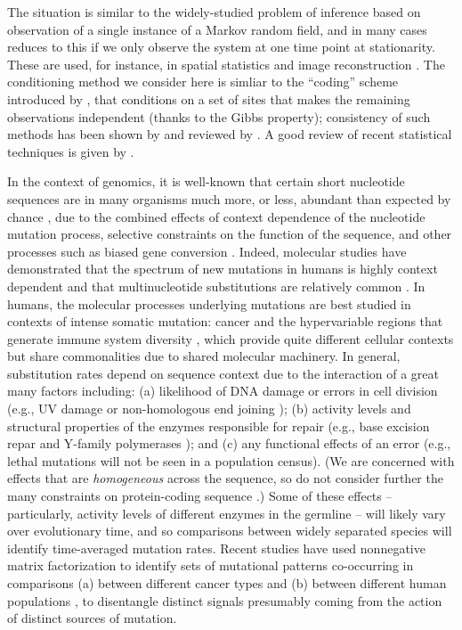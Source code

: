 \documentclass{article}
\theoremstyle{plain}
\theoremstyle{definition}
\begin{document}
The situation is similar to the widely-studied problem of inference based on observation
of a single instance of a Markov random field,
and in many cases reduces to this if we only observe the system at one time point at stationarity.
These are used, for instance, in spatial statistics \citep{besag1972nearestneighbour,gelfand2010handbook}
and image reconstruction \citep{geman1984stochastic,besag1986statistical}.
The conditioning method we consider here
is simliar to the ``coding'' scheme introduced by \citet{besag1974spatial},
that conditions on a set of sites that makes the remaining observations independent (thanks to the Gibbs property);
consistency of such methods has been shown by \citet{comets1992consistency} and reviewed by \citet{larribe2011composite}.
A good review of recent statistical techniques is given by \citet{friel2012bayesian}.


In the context of genomics,
it is well-known that certain short nucleotide sequences
are in many organisms much more, or less, abundant than expected by chance \citep{burge1992underrepresentation},
due to the combined effects of context dependence of the nucleotide mutation process,
selective constraints on the function of the sequence,
and other processes such as biased gene conversion \citep{duret2009biased}.
Indeed, molecular studies have demonstrated that the spectrum of new mutations in humans
is highly context dependent \citep{schaibley2013influence}
and that multinucleotide substitutions are relatively common \citep{schrider2011pervasive,terekhanova2013prevalence,harris2013errorprone}.
In humans, the molecular processes underlying mutations are best studied in contexts of intense somatic mutation:
cancer and the hypervariable regions that generate immune system diversity \citep{evolution_within},
which provide quite different cellular contexts but share commonalities due to shared molecular machinery.
In general, substitution rates depend on sequence context due to the interaction of a great many factors including:
(a) likelihood of DNA damage or errors in cell division (e.g., UV damage \citep{UV} or non-homologous end joining \citep{NHEJ});
(b) activity levels and structural properties of the enzymes responsible for repair (e.g., base excision repar \citep{BER} and Y-family polymerases \citep{polymerase_review});
and (c) any functional effects of an error (e.g., lethal mutations will not be seen in a population census).
(We are concerned with effects that are \emph{homogeneous} across the sequence,
so do not consider further the many constraints on protein-coding sequence \citep[reviewed in][]{thorne2007protein}.)
Some of these effects -- particularly, activity levels of different enzymes in the germline --
will likely vary over evolutionary time,
and so comparisons between widely separated species will identify time-averaged mutation rates.
Recent studies have used nonnegative matrix factorization to identify sets of mutational patterns
co-occurring in comparisons (a) between different cancer types \citep{cancer_scan} and (b) between different human populations \citep{harris,matthieson},
to disentangle distinct signals presumably coming from the action of distinct sources of mutation.
\end{document}
